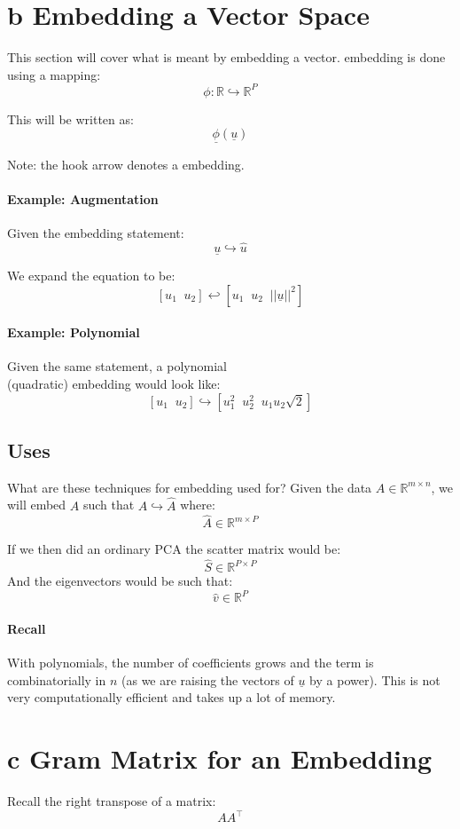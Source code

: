 \documentclass[12pt]{book}
\newcommand{\und}{%
        \underline
}
\begin{document}
\section*{b Embedding a Vector Space}
This section will cover what is meant by embedding a vector.
embedding is done using a mapping:
\[\phi : \mathbb{R} \hookrightarrow \mathbb{R}^P\]

This will be written as:
\[\underline \phi(\und u)\]

Note: the hook arrow denotes a embedding.

\paragraph{Example: Augmentation}
Given the embedding statement:
\[\und u \hookrightarrow \hat u\]

We expand the equation to be:
\[[u_1\;\;u_2]\hookleftarrow[u_1\;\;u_2\;\;||\und u||^2]\]

\paragraph{Example: Polynomial}
Given the same statement, a polynomial\\(quadratic) embedding would
look like:
\[[u_1\;\;u_2] \hookrightarrow [u_1^2\;\;u_2^2\;\;u_1u_2\sqrt2]\]

\subsection*{Uses}
What are these techniques for embedding used for?
Given the data $A \in \mathbb{R}^{m \times n}$, we will embed
$A$ such that $A \hookrightarrow \hat A$ where:
\[\hat A \in \mathbb{R}^{m \times P}\]

If we then did an ordinary PCA the scatter matrix would be:
\[\hat S \in \mathbb{R}^{P \times P}\]
And the eigenvectors would be such that:
\[\hat v \in \mathbb{R}^P\]

\paragraph{Recall}
With polynomials, the number of coefficients grows and the term
is combinatorially in $n$ (as we are raising the vectors of $\und u$ by
a power). This is not very computationally efficient and takes up a lot
of memory.

\section*{c Gram Matrix for an Embedding}
Recall the right transpose of a matrix:
\[AA^\top\]
\end{document}
